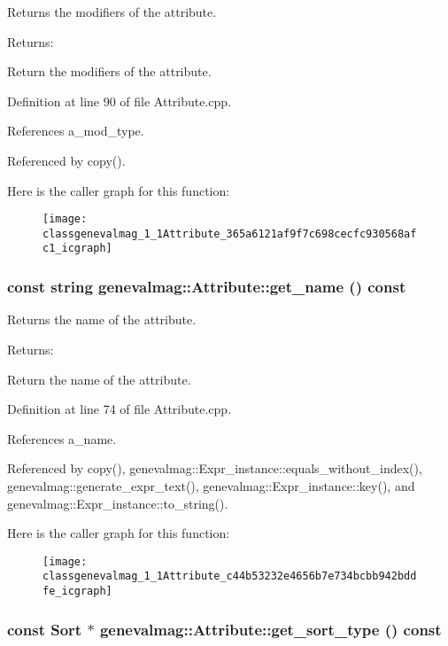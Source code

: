 Returns the modifiers of the attribute. \begin{Desc}
\item[Returns:]\end{Desc}
Return the modifiers of the attribute. 

Definition at line 90 of file Attribute.cpp.

References a\_\-mod\_\-type.

Referenced by copy().

Here is the caller graph for this function:\nopagebreak
\begin{figure}[H]
\begin{center}
\leavevmode
\texttt{[image: classgenevalmag\_1\_1Attribute\_365a6121af9f7c698cecfc930568afc1\_icgraph]}
\end{center}
\end{figure}
\hypertarget{classgenevalmag_1_1Attribute_c44b53232e4656b7e734bcbb942bddfe}{
\subsubsection[{get\_\-name}]{\setlength{\rightskip}{0pt plus 5cm}const string genevalmag::Attribute::get\_\-name () const}}
\label{classgenevalmag_1_1Attribute_c44b53232e4656b7e734bcbb942bddfe}


Returns the name of the attribute. \begin{Desc}
\item[Returns:]\end{Desc}
Return the name of the attribute. 

Definition at line 74 of file Attribute.cpp.

References a\_\-name.

Referenced by copy(), genevalmag::Expr\_\-instance::equals\_\-without\_\-index(), genevalmag::generate\_\-expr\_\-text(), genevalmag::Expr\_\-instance::key(), and genevalmag::Expr\_\-instance::to\_\-string().

Here is the caller graph for this function:\nopagebreak
\begin{figure}[H]
\begin{center}
\leavevmode
\texttt{[image: classgenevalmag\_1\_1Attribute\_c44b53232e4656b7e734bcbb942bddfe\_icgraph]}
\end{center}
\end{figure}
\hypertarget{classgenevalmag_1_1Attribute_5e04e4baa950b3c80ecbab0bf9cc56da}{
\subsubsection[{get\_\-sort\_\-type}]{\setlength{\rightskip}{0pt plus 5cm}const {\bf Sort} $\ast$ genevalmag::Attribute::get\_\-sort\_\-type () const}}
\label{classgenevalmag_1_1Attribute_5e04e4baa950b3c80ecbab0bf9cc56da}


